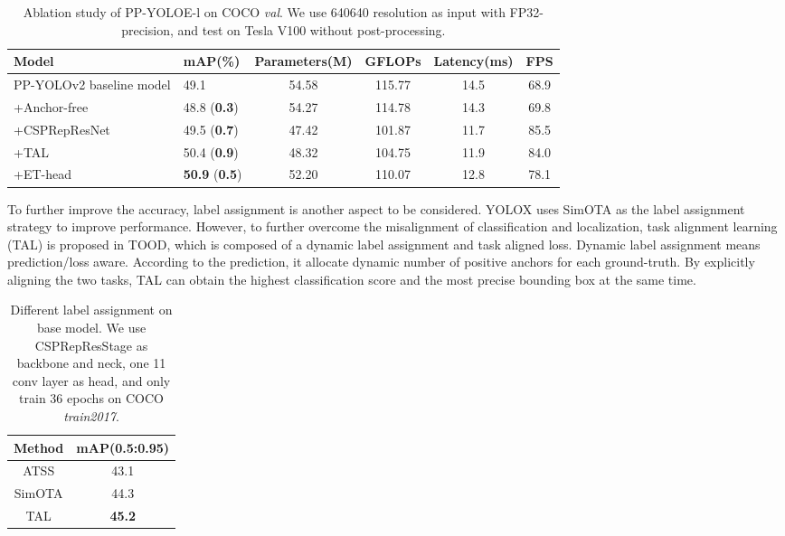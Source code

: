 \documentclass[final]{cvpr}
\begin{document}
\begin{table*}[ht]
	\begin{center}
		\begin{tabular}{l|l|c|c|c|c}
			\hline
			Model & mAP(\%) & Parameters(M) & GFLOPs &  Latency(ms) & FPS \\
			\hline \hline
			
			PP-YOLOv2 baseline model & 49.1   & 54.58  & 115.77  & 14.5  & 68.9  \\
			\hline
			
			 +Anchor-free & 48.8 (\textcolor[RGB]{50,137,50}{\small\textbf{0.3}}) & 54.27     & 114.78     &  14.3    & 69.8   \\
			 +CSPRepResNet & 49.5 (\textcolor[RGB]{225,10,10}{\small\textbf{0.7}}) & 47.42     & 101.87     & 11.7    & 85.5   \\			
			 +TAL       & 50.4 (\textcolor[RGB]{225,10,10}{\small\textbf{0.9}}) & 48.32     & 104.75     & 11.9	& 84.0    \\
			 +ET-head   &  \textbf{50.9} (\textcolor[RGB]{225,10,10}{\small\textbf{0.5}}) & 52.20     & 110.07     & 12.8	 &  78.1  \\
			\hline
		\end{tabular}
	\end{center}
	
	\caption{Ablation study of PP-YOLOE-l on COCO \textit{val}. We use 640640 resolution as input with FP32-precision, and test on Tesla V100 without post-processing.}
	\label{roadmap}
\end{table*}

 To further improve the accuracy, label assignment is another aspect to be considered. YOLOX uses SimOTA as the label assignment strategy to improve performance. However, to further overcome the misalignment of classification and localization, task alignment learning (TAL) is proposed in TOOD\cite{tood}, which is composed of a dynamic label assignment and task aligned loss. Dynamic label assignment means prediction/loss aware. According to the prediction, it allocate dynamic number of positive anchors for each ground-truth. By explicitly aligning the two tasks, TAL can obtain the highest classification score and the most precise bounding box at the same time.
\begin{table}[!h]
	\centering
	\begin{center}
		\begin{tabular}{c|c}
			\hline
			Method    & mAP(0.5:0.95) \\
			\hline
			
			ATSS\cite{atss}       &  43.1 \\
			SimOTA\cite{ge2021yolox}  &  44.3 \\
			TAL\cite{tood}         &  \textbf{45.2} \\
			\hline
		\end{tabular}
	\end{center}
	\caption{Different label assignment on base model. We use CSPRepResStage as backbone and neck, one 11 conv layer as head, and only train 36 epochs on COCO \textit{train2017}.}
	\label{label_assignment_ablation}
\end{table}
\end{document}
